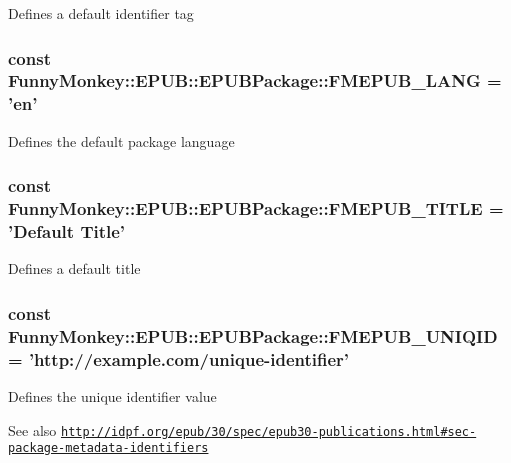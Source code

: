 \label{classFunnyMonkey_1_1EPUB_1_1EPUBPackage_a6e75be3ee6f665e90f89ef6adc96a28d}
Defines a default identifier tag \hypertarget{classFunnyMonkey_1_1EPUB_1_1EPUBPackage_a89d2d8a3d8150fa16fa009c328ed02f2}{
\subsubsection[{FMEPUB\_\-LANG}]{\setlength{\rightskip}{0pt plus 5cm}const {\bf FunnyMonkey::EPUB::EPUBPackage::FMEPUB\_\-LANG} = 'en'}}
\label{classFunnyMonkey_1_1EPUB_1_1EPUBPackage_a89d2d8a3d8150fa16fa009c328ed02f2}
Defines the default package language \hypertarget{classFunnyMonkey_1_1EPUB_1_1EPUBPackage_a199af72a2552e7150d5af0afab5d8fc1}{
\subsubsection[{FMEPUB\_\-TITLE}]{\setlength{\rightskip}{0pt plus 5cm}const {\bf FunnyMonkey::EPUB::EPUBPackage::FMEPUB\_\-TITLE} = 'Default Title'}}
\label{classFunnyMonkey_1_1EPUB_1_1EPUBPackage_a199af72a2552e7150d5af0afab5d8fc1}
Defines a default title \hypertarget{classFunnyMonkey_1_1EPUB_1_1EPUBPackage_ae79337bf6fc98f515f9c1c5850c7c860}{
\subsubsection[{FMEPUB\_\-UNIQID}]{\setlength{\rightskip}{0pt plus 5cm}const {\bf FunnyMonkey::EPUB::EPUBPackage::FMEPUB\_\-UNIQID} = 'http://example.com/unique-\/identifier'}}
\label{classFunnyMonkey_1_1EPUB_1_1EPUBPackage_ae79337bf6fc98f515f9c1c5850c7c860}
Defines the unique identifier value \begin{DoxySeeAlso}{See also}
\href{http://idpf.org/epub/30/spec/epub30-publications.html#sec-package-metadata-identifiers}{\tt http://idpf.org/epub/30/spec/epub30-\/publications.html\#sec-\/package-\/metadata-\/identifiers} 
\end{DoxySeeAlso}
